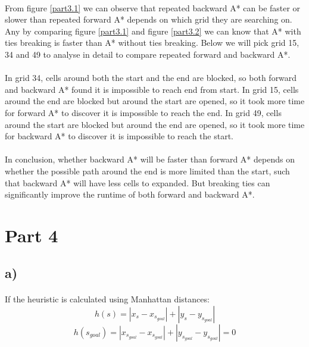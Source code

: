 \documentclass{article}
\begin{document}
\paragraph*{}
From figure \ref{part3.1} we can observe that repeated backward A* can be faster or slower than repeated forward A* depends on which grid they are searching on. Any by comparing figure \ref{part3.1} and figure \ref{part3.2} we can know that A* with ties breaking is faster than A* without ties breaking. Below we will pick grid 15, 34 and 49 to analyse in detail to compare repeated forward and backward A*.

\paragraph*{}
In grid 34, cells around both the start and the end are blocked, so both forward and backward A* found it is impossible to reach end from start.
In grid 15, cells around the end are blocked but around the start are opened, so it took more time for forward A* to discover it is impossible to reach the end.
In grid 49, cells around the start are blocked but around the end are opened, so it took more time for backward A* to discover it is impossible to reach the start.

\paragraph*{}
In conclusion, whether backward A* will be faster than forward A* depends on whether the possible path around the end is more limited than the start, such that backward A* will have less cells to expanded. But breaking ties can significantly improve the runtime of both forward and backward A*.

\newpage
\section*{Part 4}

\subsection*{a)}
\paragraph*{}
If the heuristic is calculated using Manhattan distances:
$$h(s) = |x_s - x_{s_{goal}}| + |y_s-y_{s_{goal}}|$$
$$h(s_{goal}) = |x_{s_{goal}} - x_{s_{goal}}| + |y_{s_{goal}}-y_{s_{goal}}| = 0$$
\end{document}
